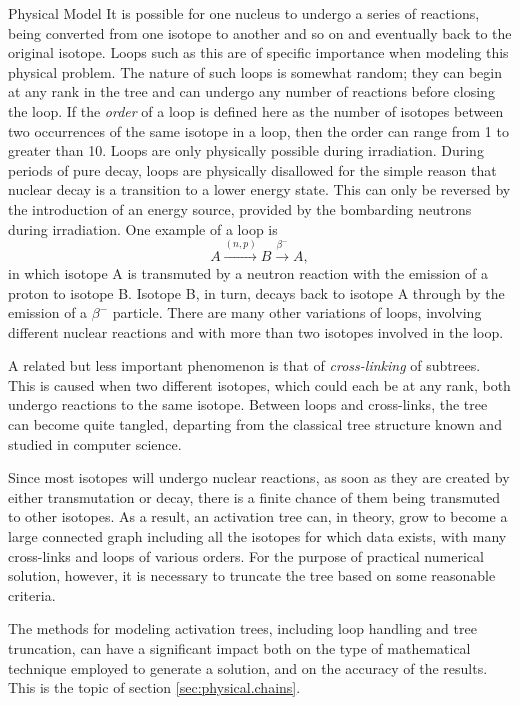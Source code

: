 \begin{chapter}{Physical Model\label{chap:physical}}
It is possible for one nucleus to undergo a series of reactions, being
converted from one isotope to another and so on and eventually back to
the original isotope.  Loops such as this are of specific importance
when modeling this physical problem.  The nature of such loops is
somewhat random; they can begin at any rank in the tree and can
undergo any number of reactions before closing the loop.  If the
\textsl{order} of a loop is defined here as the number of isotopes
between two occurrences of the same isotope in a loop, then the order
can range from 1 to greater than 10.  Loops are only physically
possible during irradiation.  During periods of pure decay, loops are
physically disallowed for the simple reason that nuclear decay is a
transition to a lower energy state.  This can only be reversed by the
introduction of an energy source, provided by the bombarding neutrons
during irradiation.  One example of a loop is
$$A \stackrel{(n,p)}{\longrightarrow} B
\stackrel{\beta^-}{\longrightarrow} A,$$
in which isotope A is transmuted by a neutron reaction with the
emission of a proton to isotope B.  Isotope B, in turn, decays back to
isotope A through by the emission of a $\beta^-$ particle.  There are
many other variations of loops, involving different nuclear reactions
and with more than two isotopes involved in the loop.
    
A related but less important phenomenon is that of
\textsl{cross-linking} of subtrees.  This is caused when two different
isotopes, which could each be at any rank, both undergo reactions to
the same isotope.  Between loops and cross-links, the tree can become
quite tangled, departing from the classical tree structure known and
studied in computer science.

Since most isotopes will undergo nuclear reactions, as soon as they
are created by either transmutation or decay, there is a finite chance
of them being transmuted to other isotopes.  As a result, an
activation tree can, in theory, grow to become a large connected graph
including all the isotopes for which data exists, with many
cross-links and loops of various orders.  For the purpose of practical
numerical solution, however, it is necessary to truncate the tree
based on some reasonable criteria.

The methods for modeling activation trees, including loop handling
and tree truncation, can have a significant impact both on the type of
mathematical technique employed to generate a solution, and on the
accuracy of the results.  This is the topic of section
\ref{sec:physical.chains}.


\end{chapter}
